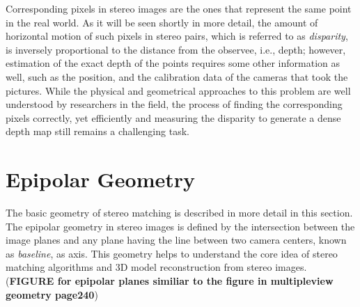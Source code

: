\documentclass[dvips,letterpaper,12pt]{report}
\begin{document}
Corresponding pixels in stereo images are the ones that represent the same point in the real
world. As it will be seen shortly in more detail, the amount of horizontal motion of such pixels
in stereo pairs, which is referred to as {\it disparity}, is inversely proportional to the
distance from the observee, i.e., depth; however,  estimation of the exact depth of the points requires some
other information as well, such as the position, and the calibration data of the cameras that took the pictures.
While the physical and geometrical approaches to this problem are well understood by researchers in the field, the process of finding the corresponding pixels correctly, yet efficiently
and measuring the disparity to generate a dense depth map still remains a challenging task. \newline

\section{Epipolar Geometry}
The basic geometry of stereo matching is described in more detail in this section. 
The epipolar geometry in stereo images is defined by the intersection between the image planes and any plane having the line between two camera centers, known as {\it baseline}, as axis. 
This geometry helps to understand the core idea of stereo matching algorithms and 3D model reconstruction from stereo images.
(\textbf {FIGURE  for epipolar planes similiar to the figure in multipleview geometry page240})
\end{document}
